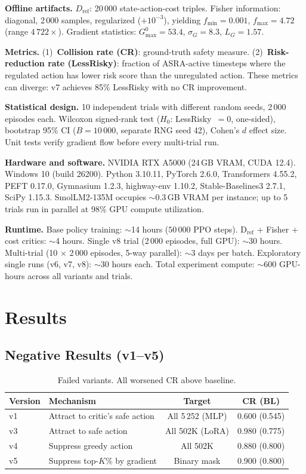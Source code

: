 \documentclass[runningheads]{llncs}
\begin{document}
\textbf{Offline artifacts.} $D_{\text{ref}}$: 20\,000 state-action-cost triples. Fisher information: diagonal, 2\,000 samples, regularized ($+10^{-3}$), yielding $f_{\min}{=}0.001$, $f_{\max}{=}4.72$ (range $4\,722\times$). Gradient statistics: $G_{\max}^0{=}53.4$, $\sigma_G{=}8.3$, $L_G{=}1.57$.

\textbf{Metrics.} (1)~\textbf{Collision rate (CR)}: ground-truth safety measure. (2)~\textbf{Risk-reduction rate (LessRisky)}: fraction of ASRA-active timesteps where the regulated action has lower risk score than the unregulated action. These metrics can diverge: v7 achieves 85\% LessRisky with no CR improvement.

\textbf{Statistical design.} 10 independent trials with different random seeds, 2\,000 episodes each. Wilcoxon signed-rank test ($H_0$: LessRisky~$= 0$, one-sided), bootstrap 95\% CI ($B{=}10\,000$, separate RNG seed 42), Cohen's $d$ effect size. Unit tests verify gradient flow before every multi-trial run.

\textbf{Hardware and software.} NVIDIA RTX A5000 (24\,GB VRAM, CUDA 12.4). Windows 10 (build 26200). Python 3.10.11, PyTorch 2.6.0, Transformers 4.55.2, PEFT 0.17.0, Gymnasium 1.2.3, highway-env 1.10.2, Stable-Baselines3 2.7.1, SciPy 1.15.3. SmolLM2-135M occupies $\sim$0.3\,GB VRAM per instance; up to 5 trials run in parallel at 98\% GPU compute utilization.

\textbf{Runtime.} Base policy training: $\sim$14 hours ($50\,000$ PPO steps). D$_{\text{ref}}$ + Fisher + cost critics: $\sim$4 hours. Single v8 trial (2\,000 episodes, full GPU): $\sim$30 hours. Multi-trial (10 $\times$ 2\,000 episodes, 5-way parallel): $\sim$3 days per batch. Exploratory single runs (v6, v7, v8): $\sim$30 hours each. Total experiment compute: $\sim$600 GPU-hours across all variants and trials.

\FloatBarrier
\section{Results}
\label{sec:results}

\subsection{Negative Results (v1--v5)}

\begin{table}[H]
\centering
\caption{Failed variants. All worsened CR above baseline.}
\label{tab:failures}
\begin{tabular}{llcc}
\toprule
Version & Mechanism & Target & CR (BL) \\
\midrule
v1 & Attract to critic's safe action & All 5\,252 (MLP) & 0.600 (0.545) \\
v3 & Attract to safe action & All 502K (LoRA) & 0.980 (0.775) \\
v4 & Suppress greedy action & All 502K & 0.880 (0.800) \\
v5 & Suppress top-$K$\% by gradient & Binary mask & 0.900 (0.800) \\
\bottomrule
\end{tabular}
\end{table}
\end{document}
